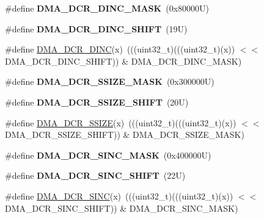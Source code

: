 \begin{DoxyCompactItemize}
\item 
\mbox{\label{group___d_m_a___register___masks_gad93bc8cb86ddeb7a40d9cd80011f8ee7}} 
\#define {\bfseries D\+M\+A\+\_\+\+D\+C\+R\+\_\+\+D\+I\+N\+C\+\_\+\+M\+A\+SK}~(0x80000\+U)
\item 
\mbox{\label{group___d_m_a___register___masks_ga9a4a7d49cd76a2821e2cf192d3a49fcd}} 
\#define {\bfseries D\+M\+A\+\_\+\+D\+C\+R\+\_\+\+D\+I\+N\+C\+\_\+\+S\+H\+I\+FT}~(19\+U)
\item 
\#define \mbox{\hyperlink{group___d_m_a___register___masks_ga65b9cb449f4a082b9151c4d2c3bbea8a}{D\+M\+A\+\_\+\+D\+C\+R\+\_\+\+D\+I\+NC}}(x)~(((uint32\+\_\+t)(((uint32\+\_\+t)(x)) $<$$<$ D\+M\+A\+\_\+\+D\+C\+R\+\_\+\+D\+I\+N\+C\+\_\+\+S\+H\+I\+FT)) \& D\+M\+A\+\_\+\+D\+C\+R\+\_\+\+D\+I\+N\+C\+\_\+\+M\+A\+SK)
\item 
\mbox{\label{group___d_m_a___register___masks_ga5be9c16cc5eddfdd04e7820f698cd401}} 
\#define {\bfseries D\+M\+A\+\_\+\+D\+C\+R\+\_\+\+S\+S\+I\+Z\+E\+\_\+\+M\+A\+SK}~(0x300000\+U)
\item 
\mbox{\label{group___d_m_a___register___masks_ga4229a9ea2db9960308edf51034836083}} 
\#define {\bfseries D\+M\+A\+\_\+\+D\+C\+R\+\_\+\+S\+S\+I\+Z\+E\+\_\+\+S\+H\+I\+FT}~(20\+U)
\item 
\#define \mbox{\hyperlink{group___d_m_a___register___masks_gac99e697c8ad0a82435cbf3ccce099886}{D\+M\+A\+\_\+\+D\+C\+R\+\_\+\+S\+S\+I\+ZE}}(x)~(((uint32\+\_\+t)(((uint32\+\_\+t)(x)) $<$$<$ D\+M\+A\+\_\+\+D\+C\+R\+\_\+\+S\+S\+I\+Z\+E\+\_\+\+S\+H\+I\+FT)) \& D\+M\+A\+\_\+\+D\+C\+R\+\_\+\+S\+S\+I\+Z\+E\+\_\+\+M\+A\+SK)
\item 
\mbox{\label{group___d_m_a___register___masks_ga5fff4a843815ef45cffdc31104379644}} 
\#define {\bfseries D\+M\+A\+\_\+\+D\+C\+R\+\_\+\+S\+I\+N\+C\+\_\+\+M\+A\+SK}~(0x400000\+U)
\item 
\mbox{\label{group___d_m_a___register___masks_gad73f08f2770d56b3d6fd8bf6b9ff1cb9}} 
\#define {\bfseries D\+M\+A\+\_\+\+D\+C\+R\+\_\+\+S\+I\+N\+C\+\_\+\+S\+H\+I\+FT}~(22\+U)
\item 
\#define \mbox{\hyperlink{group___d_m_a___register___masks_ga3c4cca7ebdd28fafc626c23e579227c5}{D\+M\+A\+\_\+\+D\+C\+R\+\_\+\+S\+I\+NC}}(x)~(((uint32\+\_\+t)(((uint32\+\_\+t)(x)) $<$$<$ D\+M\+A\+\_\+\+D\+C\+R\+\_\+\+S\+I\+N\+C\+\_\+\+S\+H\+I\+FT)) \& D\+M\+A\+\_\+\+D\+C\+R\+\_\+\+S\+I\+N\+C\+\_\+\+M\+A\+SK)
$$
\end{DoxyCompactItemize}
